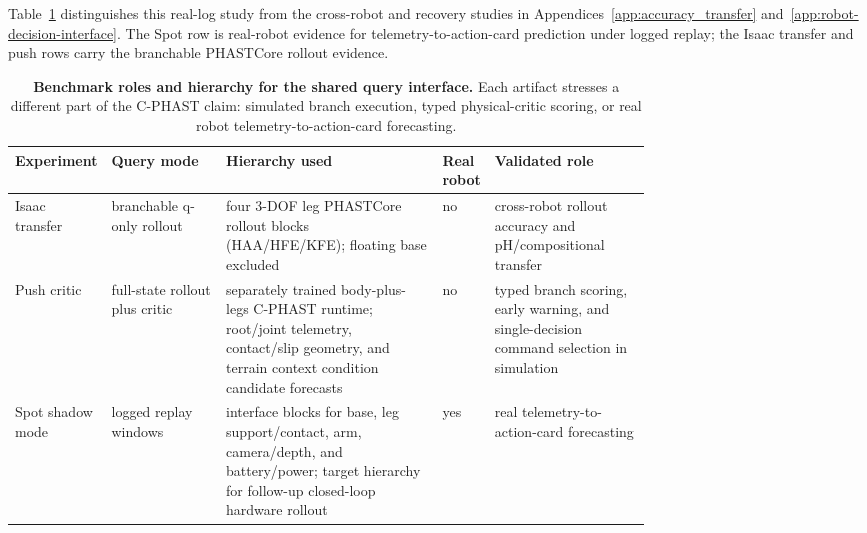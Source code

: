 Table~\ref{tab:experiment-scope-arxiv} distinguishes this real-log study from
the cross-robot and recovery studies in
Appendices~\ref{app:accuracy_transfer} and~\ref{app:robot-decision-interface}.
The Spot row is real-robot evidence for telemetry-to-action-card prediction under logged replay; the Isaac transfer and push rows carry the branchable PHASTCore rollout evidence.

\begin{table}[H]
\centering
\scriptsize
\caption{\textbf{Benchmark roles and hierarchy for the shared query interface.}
Each artifact stresses a different part of the C-PHAST claim: simulated branch execution, typed physical-critic scoring, or real robot telemetry-to-action-card forecasting.}
\label{tab:experiment-scope-arxiv}
\setlength{\tabcolsep}{3pt}
\begin{tabularx}{\linewidth}{@{}>{\raggedright\arraybackslash}p{0.14\linewidth}
>{\raggedright\arraybackslash}p{0.18\linewidth}
>{\raggedright\arraybackslash}p{0.34\linewidth}
>{\centering\arraybackslash}p{0.08\linewidth}
>{\raggedright\arraybackslash}X@{}}
\toprule
\textbf{Experiment} & \textbf{Query mode} & \textbf{Hierarchy used} & \textbf{Real robot} & \textbf{Validated role} \\
\midrule
Isaac transfer & branchable q-only rollout & four 3-DOF leg PHASTCore rollout blocks (HAA/HFE/KFE); floating base excluded & no & cross-robot rollout accuracy and pH/compositional transfer \\
Push critic & full-state rollout plus critic & separately trained body-plus-legs C-PHAST runtime; root/joint telemetry, contact/slip geometry, and terrain context condition candidate forecasts & no & typed branch scoring, early warning, and single-decision command selection in simulation \\
Spot shadow mode & logged replay windows & interface blocks for base, leg support/contact, arm, camera/depth, and battery/power; target hierarchy for follow-up closed-loop hardware rollout & yes & real telemetry-to-action-card forecasting \\
\bottomrule
\end{tabularx}
\end{table}


